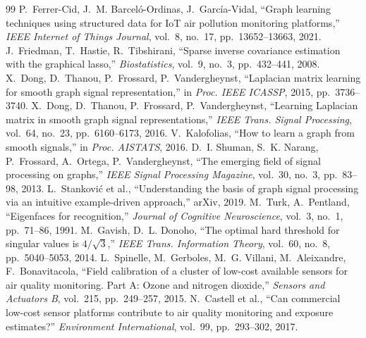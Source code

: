 \documentclass[11pt,a4paper]{article}
\begin{document}
\begin{thebibliography}{99}\small
{} P.~Ferrer-Cid, J.~M. Barcel\'o-Ordinas, J.~Garc\'ia-Vidal, ``Graph learning techniques using structured data for IoT air pollution monitoring platforms,'' \emph{IEEE Internet of Things Journal}, vol.~8, no.~17, pp.~13652--13663, 2021.
 J.~Friedman, T.~Hastie, R.~Tibshirani, ``Sparse inverse covariance estimation with the graphical lasso,'' \emph{Biostatistics}, vol.~9, no.~3, pp.~432--441, 2008.
 X.~Dong, D.~Thanou, P.~Frossard, P.~Vandergheynst, ``Laplacian matrix learning for smooth graph signal representation,'' in \emph{Proc. IEEE ICASSP}, 2015, pp.~3736--3740.
 X.~Dong, D.~Thanou, P.~Frossard, P.~Vandergheynst, ``Learning Laplacian matrix in smooth graph signal representations,'' \emph{IEEE Trans. Signal Processing}, vol.~64, no.~23, pp.~6160--6173, 2016.
 V.~Kalofolias, ``How to learn a graph from smooth signals,'' in \emph{Proc. AISTATS}, 2016.
 D.~I. Shuman, S.~K. Narang, P.~Frossard, A.~Ortega, P.~Vandergheynst, ``The emerging field of signal processing on graphs,'' \emph{IEEE Signal Processing Magazine}, vol.~30, no.~3, pp.~83--98, 2013.
 L.~Stankovi\'c et al., ``Understanding the basis of graph signal processing via an intuitive example-driven approach,'' arXiv, 2019.
 M.~Turk, A.~Pentland, ``Eigenfaces for recognition,'' \emph{Journal of Cognitive Neuroscience}, vol.~3, no.~1, pp.~71--86, 1991.
 M.~Gavish, D.~L. Donoho, ``The optimal hard threshold for singular values is $4/\sqrt3$,'' \emph{IEEE Trans. Information Theory}, vol.~60, no.~8, pp.~5040--5053, 2014.
 L.~Spinelle, M.~Gerboles, M.~G. Villani, M.~Aleixandre, F.~Bonavitacola, ``Field calibration of a cluster of low-cost available sensors for air quality monitoring. Part A: Ozone and nitrogen dioxide,'' \emph{Sensors and Actuators B}, vol.~215, pp.~249--257, 2015.
 N.~Castell et al., ``Can commercial low-cost sensor platforms contribute to air quality monitoring and exposure estimates?'' \emph{Environment International}, vol.~99, pp.~293--302, 2017.
\end{thebibliography}
\end{document}
